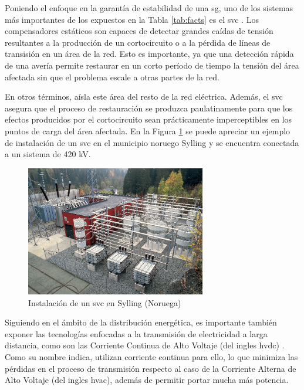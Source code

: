 Poniendo el enfoque en la garantía de estabilidad de una \gls{sg}, uno de los sistemas más importantes de los expuestos en la Tabla \ref{tab:facts} es el \gls{svc} \cite{facts}. Los compensadores estáticos son capaces de detectar grandes caídas de tensión resultantes a la producción de un cortocircuito o a la pérdida de líneas de transisión en un área de la red. Esto es importante, ya que una detección rápida de una avería permite restaurar en un corto período de tiempo la tensión del área afectada sin que el problema escale a otras partes de la red. 

\vspace{3mm}

En otros términos, aísla este área del resto de la red eléctrica. Además, el \gls{svc} asegura que el proceso de restauración se produzca paulatinamente para que los efectos producidos por el cortocircuito sean prácticamente imperceptibles en los puntos de carga del área afectada. En la Figura \ref{fig:svc} se puede apreciar un ejemplo de instalación de un \gls{svc} en el municipio noruego Sylling y se encuentra conectada a un sistema de 420 kV.

\begin{figure}[h!]
  \centering
  \includegraphics[width=0.7\textwidth]{img/teoria/svc.png}
  \caption{Instalación de un \gls{svc} en Sylling (Noruega) \cite{facts}}
  \label{fig:svc}
\end{figure}

Siguiendo en el ámbito de la distribución energética, es importante también exponer las tecnologías enfocadas a la transmisión de electricidad a larga distancia, como son las Corriente Continua de Alto Voltaje (del ingles \gls{hvdc}) \cite{hvdc}. Como su nombre indica, utilizan corriente continua para ello, lo que minimiza las pérdidas en el proceso de transmisión respecto al caso de la Corriente Alterna de Alto Voltaje (del ingles \gls{hvac}), además de permitir portar mucha más potencia. 

